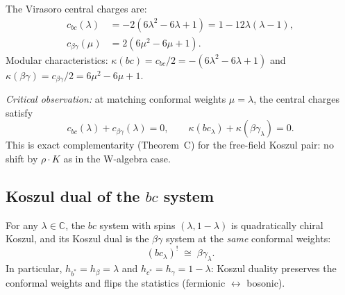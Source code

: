 \documentclass[11pt]{article}
\newcommand{\C}{\mathbb{C}}
\begin{document}
\begin{remark}
\label{rem:central-charges-bc-bg}
The Virasoro central charges are:
\begin{align}
c_{bc}(\lambda)
  &= -2(6\lambda^2 - 6\lambda + 1)
  = 1 - 12\lambda(\lambda - 1), \label{eq:c-bc-general} \\
c_{\beta\gamma}(\mu)
  &= 2(6\mu^2 - 6\mu + 1). \label{eq:c-bg-general}
\end{align}
Modular characteristics: $\kappa(bc) = c_{bc}/2 = -(6\lambda^2
- 6\lambda + 1)$ and $\kappa(\beta\gamma) = c_{\beta\gamma}/2
= 6\mu^2 - 6\mu + 1$.

\emph{Critical observation:} at matching conformal weights
$\mu = \lambda$, the central charges satisfy
\begin{equation}\label{eq:c-complementarity}
c_{bc}(\lambda) + c_{\beta\gamma}(\lambda) = 0,
\qquad
\kappa(bc_\lambda) + \kappa(\beta\gamma_\lambda) = 0.
\end{equation}
This is exact complementarity (Theorem~C) for the free-field
Koszul pair: no shift by $\rho \cdot K$ as in the W-algebra
case.
\end{remark}


\subsection{Koszul dual of the $bc$ system}

\begin{theorem}
\label{thm:bc-koszul-general-spin}
For any $\lambda \in \C$, the $bc$ system with spins
$(\lambda, 1{-}\lambda)$ is quadratically chiral Koszul,
and its Koszul dual is the $\beta\gamma$ system at
the \emph{same} conformal weights:
\begin{equation}\label{eq:bc-koszul-dual}
(bc_\lambda)^!
\;\cong\;
\beta\gamma_\lambda.
\end{equation}
In particular, $h_{b^*} = h_\beta = \lambda$ and
$h_{c^*} = h_\gamma = 1 - \lambda$: Koszul duality
preserves the conformal weights and flips the statistics
(fermionic $\leftrightarrow$ bosonic).
\end{theorem}
\end{document}
